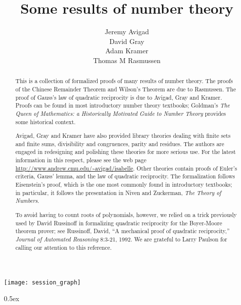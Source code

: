 \documentclass[11pt,a4paper]{article}
\begin{document}
\title{Some results of number theory}
\author{Jeremy Avigad\\
    David Gray\\
    Adam Kramer\\
    Thomas M Rasmussen}

\maketitle

\begin{abstract}
This is a collection of formalized proofs of many results of number theory.
The proofs of the Chinese Remainder Theorem and Wilson's Theorem are due to
Rasmussen.  The proof of Gauss's law of quadratic reciprocity is due to
Avigad, Gray and Kramer.  Proofs can be found in most introductory number
theory textbooks; Goldman's \emph{The Queen of Mathematics: a Historically
Motivated Guide to Number Theory} provides some historical context.

Avigad, Gray and Kramer have also provided library theories dealing with
finite sets and finite sums, divisibility and congruences, parity and
residues.  The authors are engaged in redesigning and polishing these theories
for more serious use.  For the latest information in this respect, please see
the web page \url{http://www.andrew.cmu.edu/~avigad/isabelle}.  Other theories
contain proofs of Euler's criteria, Gauss' lemma, and the law of quadratic
reciprocity.  The formalization follows Eisenstein's proof, which is the one
most commonly found in introductory textbooks; in particular, it follows the
presentation in Niven and Zuckerman, \emph{The Theory of Numbers}.

To avoid having to count roots of polynomials, however, we relied on a trick
previously used by David Russinoff in formalizing quadratic reciprocity for
the Boyer-Moore theorem prover; see Russinoff, David, ``A mechanical proof
of quadratic reciprocity,'' \emph{Journal of Automated Reasoning} 8:3-21,
1992.  We are grateful to Larry Paulson for calling our attention to this
reference.
\end{abstract}

\tableofcontents

\begin{center}
  \texttt{[image: session\_graph]}  
\end{center}

\newpage

\parindent 0pt\parskip 0.5ex

\end{document}

